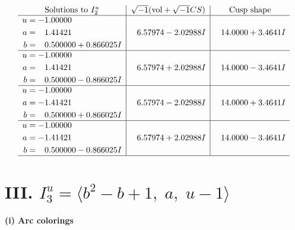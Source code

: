 \documentclass[1p]{elsarticle_modified}
\theoremstyle{definition}
\newcommand{\I}{\sqrt{-1}}
\begin{document}
$$\begin{array}{c|c|c}  
\text{Solutions to }I^u_{2}& \I (\text{vol} + \sqrt{-1}CS) & \text{Cusp shape}\\
 \hline 
\begin{aligned}
u &= -1.00000\phantom{ +0.000000I} \\
a &= \phantom{-}1.41421\phantom{ +0.000000I} \\
b &= \phantom{-}0.500000 + 0.866025 I\end{aligned}
 & \phantom{-}6.57974 - 2.02988 I & \phantom{-}14.0000 + 3.4641 I \\ \hline\begin{aligned}
u &= -1.00000\phantom{ +0.000000I} \\
a &= \phantom{-}1.41421\phantom{ +0.000000I} \\
b &= \phantom{-}0.500000 - 0.866025 I\end{aligned}
 & \phantom{-}6.57974 + 2.02988 I & \phantom{-}14.0000 - 3.4641 I \\ \hline\begin{aligned}
u &= -1.00000\phantom{ +0.000000I} \\
a &= -1.41421\phantom{ +0.000000I} \\
b &= \phantom{-}0.500000 + 0.866025 I\end{aligned}
 & \phantom{-}6.57974 - 2.02988 I & \phantom{-}14.0000 + 3.4641 I \\ \hline\begin{aligned}
u &= -1.00000\phantom{ +0.000000I} \\
a &= -1.41421\phantom{ +0.000000I} \\
b &= \phantom{-}0.500000 - 0.866025 I\end{aligned}
 & \phantom{-}6.57974 + 2.02988 I & \phantom{-}14.0000 - 3.4641 I\\
 \hline 
 \end{array}$$\newpage\newpage\renewcommand{\arraystretch}{1}
\centering \section*{III. $I^u_{3}= \langle b^2- b+1,\;a,\;u-1 \rangle$}
\flushleft \textbf{(i) Arc colorings}\\
\end{document}
